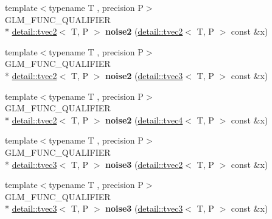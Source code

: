 \begin{DoxyCompactItemize}
\item 
\hypertarget{namespaceglm_aa3cab4c28d156aff0cc38c6870d0b8f8}{{\footnotesize template$<$typename T , precision P$>$ }\\G\-L\-M\-\_\-\-F\-U\-N\-C\-\_\-\-Q\-U\-A\-L\-I\-F\-I\-E\-R \\*
\hyperlink{structglm_1_1detail_1_1tvec2}{detail\-::tvec2}$<$ T, P $>$ {\bfseries noise2} (\hyperlink{structglm_1_1detail_1_1tvec2}{detail\-::tvec2}$<$ T, P $>$ const \&x)}\label{namespaceglm_aa3cab4c28d156aff0cc38c6870d0b8f8}

\item 
\hypertarget{namespaceglm_a745a9e2a6d7e0cd2c357b38a1677b273}{{\footnotesize template$<$typename T , precision P$>$ }\\G\-L\-M\-\_\-\-F\-U\-N\-C\-\_\-\-Q\-U\-A\-L\-I\-F\-I\-E\-R \\*
\hyperlink{structglm_1_1detail_1_1tvec2}{detail\-::tvec2}$<$ T, P $>$ {\bfseries noise2} (\hyperlink{structglm_1_1detail_1_1tvec3}{detail\-::tvec3}$<$ T, P $>$ const \&x)}\label{namespaceglm_a745a9e2a6d7e0cd2c357b38a1677b273}

\item 
\hypertarget{namespaceglm_adb040cdde4e6d6b1fe8715368689bb92}{{\footnotesize template$<$typename T , precision P$>$ }\\G\-L\-M\-\_\-\-F\-U\-N\-C\-\_\-\-Q\-U\-A\-L\-I\-F\-I\-E\-R \\*
\hyperlink{structglm_1_1detail_1_1tvec2}{detail\-::tvec2}$<$ T, P $>$ {\bfseries noise2} (\hyperlink{structglm_1_1detail_1_1tvec4}{detail\-::tvec4}$<$ T, P $>$ const \&x)}\label{namespaceglm_adb040cdde4e6d6b1fe8715368689bb92}

\item 
\hypertarget{namespaceglm_ac547b12bbecbb0750aaa57e1aadf5292}{{\footnotesize template$<$typename T , precision P$>$ }\\G\-L\-M\-\_\-\-F\-U\-N\-C\-\_\-\-Q\-U\-A\-L\-I\-F\-I\-E\-R \\*
\hyperlink{structglm_1_1detail_1_1tvec3}{detail\-::tvec3}$<$ T, P $>$ {\bfseries noise3} (\hyperlink{structglm_1_1detail_1_1tvec2}{detail\-::tvec2}$<$ T, P $>$ const \&x)}\label{namespaceglm_ac547b12bbecbb0750aaa57e1aadf5292}

\item 
\hypertarget{namespaceglm_a786c7437a3a5ce6841dceb147b30af81}{{\footnotesize template$<$typename T , precision P$>$ }\\G\-L\-M\-\_\-\-F\-U\-N\-C\-\_\-\-Q\-U\-A\-L\-I\-F\-I\-E\-R \\*
\hyperlink{structglm_1_1detail_1_1tvec3}{detail\-::tvec3}$<$ T, P $>$ {\bfseries noise3} (\hyperlink{structglm_1_1detail_1_1tvec3}{detail\-::tvec3}$<$ T, P $>$ const \&x)}\label{namespaceglm_a786c7437a3a5ce6841dceb147b30af81}


\end{DoxyCompactItemize}
